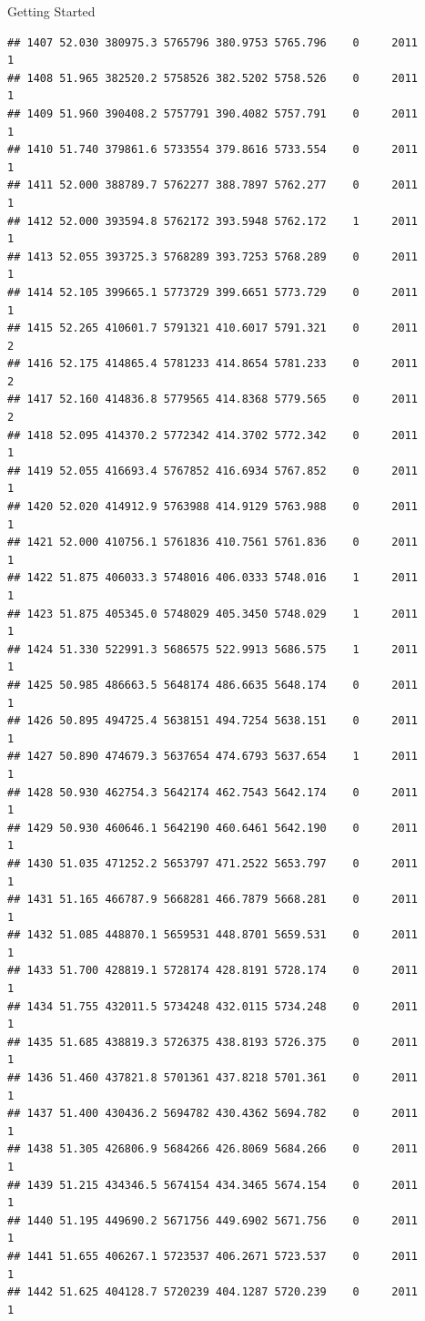 \documentclass[
  ignorenonframetext,
]{beamer}
\begin{document}
\begin{frame}[fragile]{Getting Started}
\begin{verbatim}
## 1407 52.030 380975.3 5765796 380.9753 5765.796    0     2011        1
## 1408 51.965 382520.2 5758526 382.5202 5758.526    0     2011        1
## 1409 51.960 390408.2 5757791 390.4082 5757.791    0     2011        1
## 1410 51.740 379861.6 5733554 379.8616 5733.554    0     2011        1
## 1411 52.000 388789.7 5762277 388.7897 5762.277    0     2011        1
## 1412 52.000 393594.8 5762172 393.5948 5762.172    1     2011        1
## 1413 52.055 393725.3 5768289 393.7253 5768.289    0     2011        1
## 1414 52.105 399665.1 5773729 399.6651 5773.729    0     2011        1
## 1415 52.265 410601.7 5791321 410.6017 5791.321    0     2011        2
## 1416 52.175 414865.4 5781233 414.8654 5781.233    0     2011        2
## 1417 52.160 414836.8 5779565 414.8368 5779.565    0     2011        2
## 1418 52.095 414370.2 5772342 414.3702 5772.342    0     2011        1
## 1419 52.055 416693.4 5767852 416.6934 5767.852    0     2011        1
## 1420 52.020 414912.9 5763988 414.9129 5763.988    0     2011        1
## 1421 52.000 410756.1 5761836 410.7561 5761.836    0     2011        1
## 1422 51.875 406033.3 5748016 406.0333 5748.016    1     2011        1
## 1423 51.875 405345.0 5748029 405.3450 5748.029    1     2011        1
## 1424 51.330 522991.3 5686575 522.9913 5686.575    1     2011        1
## 1425 50.985 486663.5 5648174 486.6635 5648.174    0     2011        1
## 1426 50.895 494725.4 5638151 494.7254 5638.151    0     2011        1
## 1427 50.890 474679.3 5637654 474.6793 5637.654    1     2011        1
## 1428 50.930 462754.3 5642174 462.7543 5642.174    0     2011        1
## 1429 50.930 460646.1 5642190 460.6461 5642.190    0     2011        1
## 1430 51.035 471252.2 5653797 471.2522 5653.797    0     2011        1
## 1431 51.165 466787.9 5668281 466.7879 5668.281    0     2011        1
## 1432 51.085 448870.1 5659531 448.8701 5659.531    0     2011        1
## 1433 51.700 428819.1 5728174 428.8191 5728.174    0     2011        1
## 1434 51.755 432011.5 5734248 432.0115 5734.248    0     2011        1
## 1435 51.685 438819.3 5726375 438.8193 5726.375    0     2011        1
## 1436 51.460 437821.8 5701361 437.8218 5701.361    0     2011        1
## 1437 51.400 430436.2 5694782 430.4362 5694.782    0     2011        1
## 1438 51.305 426806.9 5684266 426.8069 5684.266    0     2011        1
## 1439 51.215 434346.5 5674154 434.3465 5674.154    0     2011        1
## 1440 51.195 449690.2 5671756 449.6902 5671.756    0     2011        1
## 1441 51.655 406267.1 5723537 406.2671 5723.537    0     2011        1
## 1442 51.625 404128.7 5720239 404.1287 5720.239    0     2011        1

\end{verbatim}
\end{frame}
\end{document}
